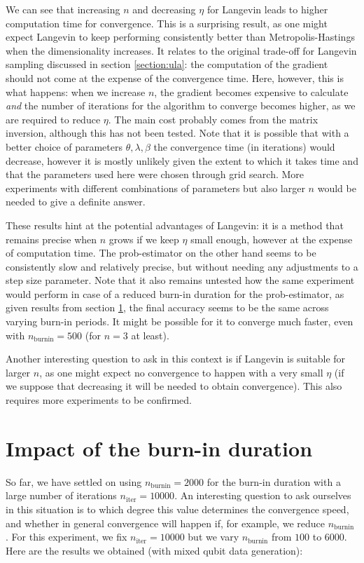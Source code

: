 \documentclass[12pt]{memoir}
\newcommand{\nitern}[1]{$n_{\text{iter}}=#1$}
\newcommand{\nburninn}[1]{$n_{\text{burnin}}=#1$}
\newcommand{\nburnin}[0]{$n_{\text{burnin}} $ }
\begin{document}
We can see that increasing $n$ and decreasing $\eta$ for Langevin leads to higher computation time for convergence. This is a surprising result, as one might expect Langevin to keep performing consistently better than Metropolis-Hastings when the dimensionality increases. It relates to the original trade-off for Langevin sampling discussed in section \ref{section:ula}: the computation of the gradient should not come at the expense of the convergence time. Here, however, this is what happens: when we increase $n$, the gradient becomes expensive to calculate \textit{and} the number of iterations for the algorithm to converge becomes higher, as we are required to reduce $\eta$. The main cost probably comes from the matrix inversion, although this has not been tested. Note that it is possible that with a better choice of parameters $\theta,\lambda,\beta$ the convergence time (in iterations) would decrease, however it is mostly unlikely given the extent to which it takes time and that the parameters used here were chosen through grid search. More experiments with different combinations of parameters but also larger $n$ would be needed to give a definite answer.\medbreak


These results hint at the potential advantages of Langevin: it is a method that remains precise when $n$ grows if we keep $\eta$ small enough, however at the expense of computation time. The prob-estimator on the other hand seems to be consistently slow and relatively precise, but without needing any adjustments to a step size parameter. Note that it also remains untested how the same experiment would perform in case of a reduced burn-in duration for the prob-estimator, as given results from section \ref{section:comp-burnin}, the final accuracy seems to be the same across varying burn-in periods. It might be possible for it to converge much faster, even with \nburninn{500} (for $n=3$ at least).\medbreak


Another interesting question to ask in this context is if Langevin is suitable for larger $n$, as one might expect no convergence to happen with a very small $\eta$ (if we suppose that decreasing it will be needed to obtain convergence). This also requires more experiments to be confirmed.


\section{Impact of the burn-in duration}\label{section:comp-burnin}

So far, we have settled on using \nburninn{2000} for the burn-in duration with a large number of iterations \nitern{10000}. An interesting question to ask ourselves in this situation is to which degree this value determines the convergence speed, and whether in general convergence will happen if, for example, we reduce \nburnin. For this experiment, we fix \nitern{10000} but we vary \nburnin from $100$ to $6000$. Here are the results we obtained (with mixed qubit data generation):
\end{document}
